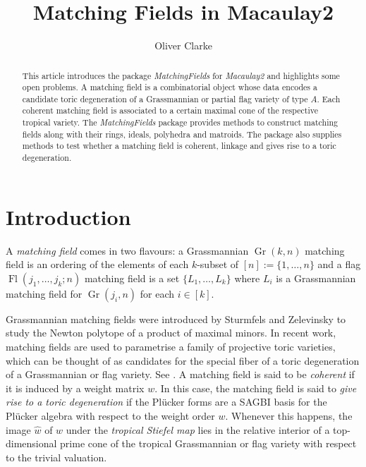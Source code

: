 \documentclass[11pt]{article}
\title{Matching Fields in Macaulay2}
\author{Oliver Clarke}
\date{}
\DeclareMathOperator{\Fl}{Fl}
\DeclareMathOperator{\Gr}{Gr}
\theoremstyle{plain}
\theoremstyle{definition}
\theoremstyle{remark}
\begin{document}
\maketitle

\begin{abstract}
    This article introduces the package \textit{MatchingFields} for \textit{Macaulay2} and highlights some open problems.
    A matching field is a combinatorial object whose data encodes a candidate toric degeneration of a Grassmannian or partial flag variety of type $A$. Each coherent matching field is associated to a certain maximal cone of the respective tropical variety. The \textit{MatchingFields} package provides methods to construct matching fields along with their rings, ideals, polyhedra and matroids. The package also supplies methods to test whether a matching field is coherent, linkage and gives rise to a toric degeneration.
\end{abstract}

\tableofcontents


\section{Introduction}

A \textit{matching field} comes in two flavours: a Grassmannian $\Gr(k,n)$ matching field is an ordering of the elements of each $k$-subset of $[n] := \{1, \dots, n \}$ and a flag $\Fl(j_1, \dots, j_k; n)$ matching field is a set $\{L_1, \dots, L_k\}$ where $L_i$ is a Grassmannian matching field for $\Gr(j_i, n)$ for each $i \in [k]$. 


Grassmannian matching fields were introduced by Sturmfels and Zelevinsky \cite{sturmfels1993maximal} to study the Newton polytope of a product of maximal minors.
In recent work, matching fields are used to parametrise a family of projective toric varieties, which can be thought of as candidates for the special fiber of a toric degeneration of a Grassmannian or flag variety. See  \cite{mohammadi2019matching, clarke2020schubert, clarke2021flag, clarke2022partial}. A matching field is said to be \textit{coherent} if it is induced by a weight matrix $w$.
In this case, the matching field is said to \textit{give rise to a toric degeneration} if the Pl\"ucker forms are a SAGBI basis for the Pl\"ucker algebra with respect to the weight order $w$. Whenever this happens, the image $\widehat w$ of $w$ under the \textit{tropical Stiefel map} \cite{fink2015stiefel} lies in the relative interior of a top-dimensional prime cone of the tropical Grassmannian \cite{speyer2004tropical} or flag variety with respect to the trivial valuation. 
\end{document}
